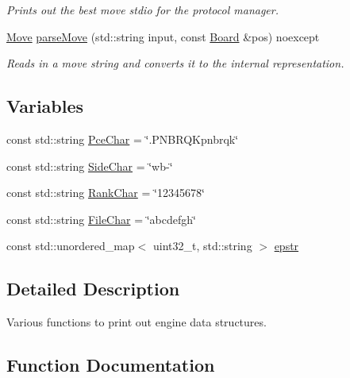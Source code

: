 \begin{DoxyCompactItemize}
\begin{DoxyCompactList}\small\item\em Prints out the best move stdio for the protocol manager. \end{DoxyCompactList}\item 
\mbox{\hyperlink{classMove}{Move}} \mbox{\hyperlink{namespaceIO_aade794118f1d0f0cba9d335e10360ce1}{parse\+Move}} (std\+::string input, const \mbox{\hyperlink{classBoard}{Board}} \&pos) noexcept
\begin{DoxyCompactList}\small\item\em Reads in a move string and converts it to the internal representation. \end{DoxyCompactList}\end{DoxyCompactItemize}
\subsection*{Variables}
\begin{DoxyCompactItemize}
\item 
const std\+::string \mbox{\hyperlink{namespaceIO_a1c70218e9ea5ec5ff1a2a3e486dc1c9d}{Pce\+Char}} = \char`\"{}.P\+N\+B\+R\+Q\+Kpnbrqk\char`\"{}
\item 
const std\+::string \mbox{\hyperlink{namespaceIO_ac0e91e487904b7ef2a84da82dd8163b1}{Side\+Char}} = \char`\"{}wb-\/\char`\"{}
\item 
const std\+::string \mbox{\hyperlink{namespaceIO_aa43c5eefed9ad388801e187fb1c4b9f7}{Rank\+Char}} = \char`\"{}12345678\char`\"{}
\item 
const std\+::string \mbox{\hyperlink{namespaceIO_af411d58290cad5da877276bff7704388}{File\+Char}} = \char`\"{}abcdefgh\char`\"{}
\item 
const std\+::unordered\+\_\+map$<$ uint32\+\_\+t, std\+::string $>$ \mbox{\hyperlink{namespaceIO_a64af1143e1386143bb867f972b2d2c58}{epstr}}
\end{DoxyCompactItemize}


\subsection{Detailed Description}
Various functions to print out engine data structures. 

\subsection{Function Documentation}
\mbox{\label{namespaceIO_aade794118f1d0f0cba9d335e10360ce1}} 
